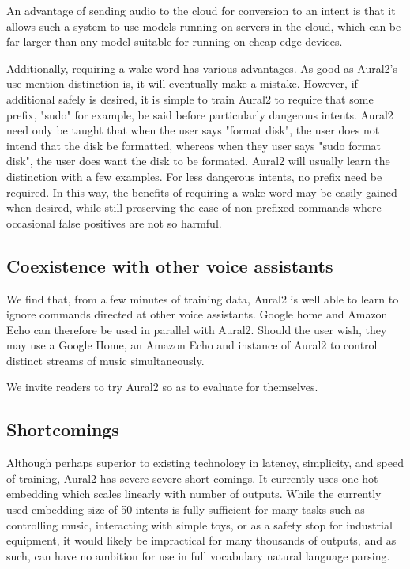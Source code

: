 \documentclass[conference]{IEEEtran}
\begin{document}
An advantage of sending audio to the cloud for conversion to an intent
is that it allows such a system to use models running on servers in the
cloud, which can be far larger than any model suitable for running on
cheap edge devices.

Additionally, requiring a wake word has various advantages.
As good as Aural2's use-mention distinction is, it will eventually make a mistake.
However, if additional safely is desired, it is simple to train Aural2
to require that some prefix, "sudo" for example, be said before particularly dangerous intents.
Aural2 need only be taught that when the user says "format disk", the user does not intend that the disk be formatted,
whereas when they user says "sudo format disk", the user does want the disk to be formated.
Aural2 will usually learn the distinction with a few examples.
For less dangerous intents, no prefix need be required.
In this way, the benefits of requiring a wake word may be easily gained when desired,
while still preserving the ease of non-prefixed commands where occasional false positives are not so harmful.

\subsection{Coexistence with other voice assistants}
We find that, from a few minutes of training data, Aural2 is well able to learn to ignore commands directed at other voice assistants.
Google home and Amazon Echo can therefore be used in parallel with Aural2.
Should the user wish, they may use a Google Home, an Amazon Echo and instance of Aural2 to control distinct streams of music simultaneously.

We invite readers to try Aural2 so as to evaluate for themselves.

\subsection{Shortcomings}
Although perhaps superior to existing technology in latency, simplicity,
and speed of training, Aural2 has severe severe short comings.
It currently uses one-hot embedding which scales linearly with number of outputs.
While the currently used embedding size of 50 intents is fully sufficient for many tasks such as controlling music, interacting with simple toys, or as a safety stop for industrial equipment, it would likely be impractical for many thousands of outputs, and as such, can have no ambition for use in full vocabulary natural language parsing.
\end{document}
